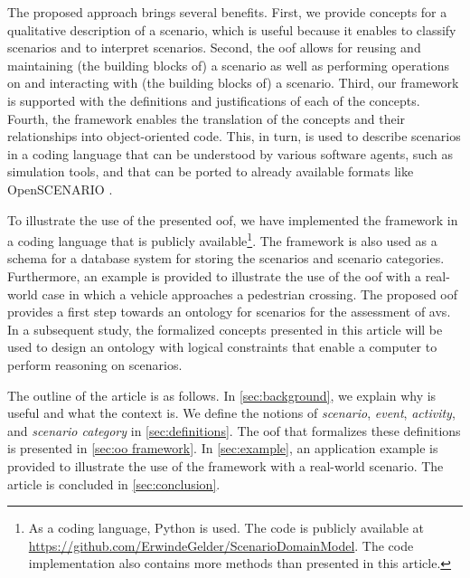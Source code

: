 The proposed approach brings several benefits.
First, we provide concepts for a qualitative description of a scenario, which is useful because it enables to classify scenarios and to interpret scenarios. 
Second, the \ac{oof} allows for reusing and maintaining (the building blocks of) a scenario as well as performing operations on and interacting with (the building blocks of) a scenario.
Third, our framework is supported with the definitions and justifications of each of the \cendc\cstartd concepts\cendd\cstartc.
Fourth, the framework enables the translation of the \cendc\cstartd concepts and their relationships \cendd\cstartc into object-oriented code.
This, in turn, is used to describe scenarios in a coding language that can be understood by various software agents, such as simulation tools\cendc\cstartd, and that can be ported to already available formats like OpenSCENARIO \cite{openscenario}. \cendd

\cstartc To illustrate the use of the presented \ac{oof}, we have implemented the framework in a coding language that is publicly available\footnote{As a coding language, Python is used. The code is publicly available at \url{https://github.com/ErwindeGelder/ScenarioDomainModel}. \cstarte The code implementation also contains more methods than presented in this article.\cende}.
The framework is also used as a schema for a database system for storing the scenarios and scenario categories.
Furthermore, an example is provided to illustrate the use of the \ac{oof} with a real-world case \cendc\cstartf in which a vehicle approaches a pedestrian crossing\cendf\cstartc.
The proposed \ac{oof} provides a first step towards an ontology \autocite{siricharoen2009ontology} for scenarios for the assessment of \acp{av}. In a subsequent study, the formalized concepts presented in this article \cendc\cstartf will be \cendf\cstartc used to design an ontology with logical constraints that enable a computer to perform reasoning on scenarios.
\cendc

The outline of the article is as follows. In \cref{sec:background}, we explain why \cstartb {} \cendb is useful and what the context is. 
We define the notions of \emph{scenario}, \emph{event}, \emph{activity}, and \emph{scenario category}  in \cref{sec:definitions}. 
The \cstartb \ac{oof} \cendb that formalizes these definitions is presented in \cref{sec:oo framework}. 
In \cref{sec:example}, an application example is provided to illustrate the use of the \cstartb framework \cendb with a real-world scenario. 
The article is concluded in \cref{sec:conclusion}.
